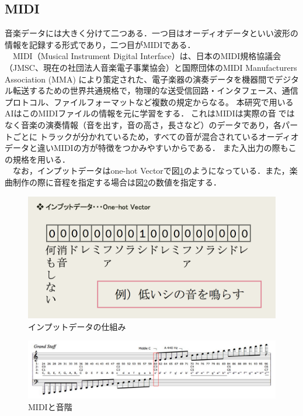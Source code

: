 \subsection{MIDI}
音楽データには大きく分けて二つある．一つ目はオーディオデータといい波形の情報を記録する形式であり，二つ目がMIDIである．\\
　MIDI（Musical Instrument Digital Interface）は、日本のMIDI規格協議会（JMSC、現在の社団法人音楽電子事業協会）と国際団体のMIDI Manufacturers Association (MMA) により策定された、電子楽器の演奏データを機器間でデジタル転送するための世界共通規格で，物理的な送受信回路・インタフェース、通信プロトコル、ファイルフォーマットなど複数の規定からなる。
本研究で用いるAIはこのMIDIファイルの情報を元に学習をする．これはMIDIは実際の音ではなく音楽の演奏情報（音を出す，音の高さ，長さなど）のデータであり，各パートごとにトラックが分かれているため，すべての音が混合されているオーディオデータと違いMIDIの方が特徴をつかみやすいからである．
また入出力の際もこの規格を用いる．\\
　なお，インプットデータはone-hot Vectorで図\ref{fig:インプットデータの仕組み}のようになっている．また，楽曲制作の際に音程を指定する場合は図\ref{fig:MIDIと音階}の数値を指定する．
\begin{figure}[h]
    \begin{screen}
    \begin{center}
        \includegraphics[scale=0.85,clip]{./img/midi1.png}
        \caption{インプットデータの仕組み}
        \label{fig:インプットデータの仕組み}
    \end{center}
    \end{screen}
\end{figure}
\newpage
\begin{figure}[h]
    \begin{screen}
    \begin{center}
        \includegraphics[scale=0.45,clip]{./img/midi2.png}
        \caption{MIDIと音階}
        \label{fig:MIDIと音階}
    \end{center}
    \end{screen}
\end{figure}
\newpage
